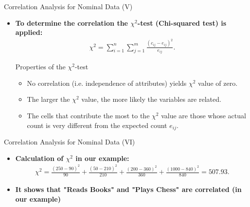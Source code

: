 \begin{frame}{Correlation Analysis for Nominal Data (V)}
	\begin{itemize}
		\item \textbf{To determine the correlation the
				      {\color{airforceblue}$\chi^2$-test} (Chi-squared test) is
			      applied:}
		      \begin{align*}
			      \chi^2 = \sum_{i=1}^{n}\sum_{j=1}^{m}
			      \frac{(c_{ij}-e_{ij})^2}{e_{ij}}.
		      \end{align*}
		      \begin{block}{Properties of the $\chi^2$-test}
			      \begin{itemize}
				      \item No correlation (i.e. independence of attributes) yields
				            $\chi^2$
				            value of zero.
				      \item The larger the $\chi^2$ value, the more likely the
				            variables are
				            related.
				      \item The cells that contribute the most to the $\chi^2$ value
				            are those whose actual count is very different from the
				            expected count
				            $e_{ij}$.
			      \end{itemize}
		      \end{block}
	\end{itemize}
\end{frame}

\begin{frame}{Correlation Analysis for Nominal Data (VI)}
	\begin{itemize}
		\item \textbf{Calculation of $\chi^2$ in our example:}
		      \begin{align*}
			      \chi^2 = \frac{(250-90)^2}{90} + \frac{(50-210)^2}{210} +
			      \frac{(200-360)^2}{360} + \frac{(1000-840)^2}{840} = 507.93.
		      \end{align*}
		\item \textbf{It shows that "Reads Books" and "Plays Chess" are
			      correlated (in our example)}
	\end{itemize}
\end{frame}

